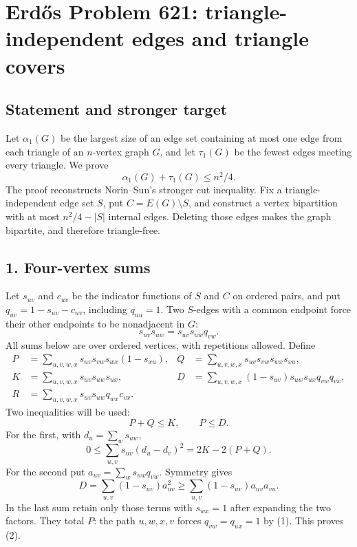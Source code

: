\section{Erd\H{o}s Problem 621: triangle-independent edges and triangle covers}
\subsection*{Statement and stronger target}
Let $\alpha_1(G)$ be the largest size of an edge set containing at most one edge from each triangle of an $n$-vertex graph $G$, and let $\tau_1(G)$ be the fewest edges meeting every triangle. We prove
\[
 \alpha_1(G)+\tau_1(G)\le n^2/4.
\]
The proof reconstructs Norin--Sun's stronger cut inequality. Fix a triangle-independent edge set $S$, put $C=E(G)\setminus S$, and construct a vertex bipartition with at most $n^2/4-|S|$ internal edges. Deleting those edges makes the graph bipartite, and therefore triangle-free.

\subsection*{1. Four-vertex sums}
Let $s_{uv}$ and $c_{uv}$ be the indicator functions of $S$ and $C$ on ordered pairs, and put $q_{uv}=1-s_{uv}-c_{uv}$, including $q_{uu}=1$. Two $S$-edges with a common endpoint force their other endpoints to be nonadjacent in $G$:
\[
 s_{uv}s_{uw}=s_{uv}s_{uw}q_{vw}. \tag{1}
\]
All sums below are over ordered vertices, with repetitions allowed. Define
\begin{align*}
 P&=\sum_{u,v,w,x}s_{uv}s_{vw}s_{wx}(1-s_{xu}),&
 Q&=\sum_{u,v,w,x}s_{uv}s_{vw}s_{wx}s_{xu},\\
 K&=\sum_{u,v,w,x}s_{uv}s_{uw}s_{ux},&
 D&=\sum_{u,v,w,x}(1-s_{uv})s_{uw}s_{ux}q_{vw}q_{vx},\\
 R&=\sum_{u,v,w,x}s_{uv}s_{uw}q_{wx}c_{vx}.
\end{align*}
Two inequalities will be used:
\[
 P+Q\le K,\qquad P\le D. \tag{2}
\]
For the first, with $d_u=\sum_ws_{uw}$,
\[
 0\le\sum_{u,v}s_{uv}(d_u-d_v)^2=2K-2(P+Q).
\]
For the second put $a_{uv}=\sum_ws_{uw}q_{vw}$. Symmetry gives
\[
 D=\sum_{u,v}(1-s_{uv})a_{uv}^2
 \ge\sum_{u,v}(1-s_{uv})a_{uv}a_{vu}.
\]
In the last sum retain only those terms with $s_{wx}=1$ after expanding the two factors. They total $P$: the path $u,w,x,v$ forces $q_{vw}=q_{ux}=1$ by (1). This proves (2).

